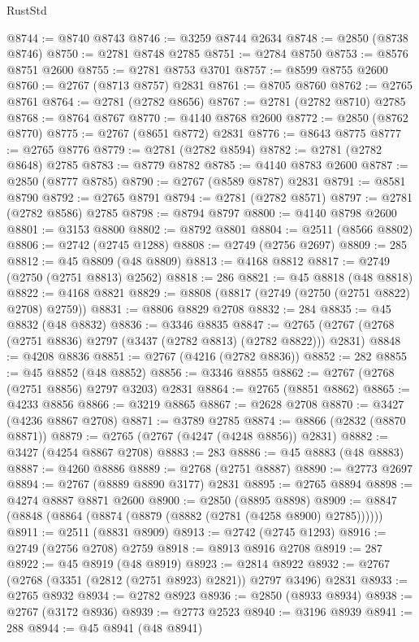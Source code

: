 \begin{lexlean}{RustStd}
\begin{coremodule}
@8744 := @8740 @8743
@8746 := @3259 @8744 @2634
@8748 := @2850 (@8738 @8746)
@8750 := @2781 @8748 @2785
@8751 := @2784 @8750
@8753 := @8576 @8751 @2600
@8755 := @2781 @8753 @3701
@8757 := @8599 @8755 @2600
@8760 := @2767 (@8713 @8757) @2831
@8761 := @8705 @8760
@8762 := @2765 @8761
@8764 := @2781 (@2782 @8656)
@8767 := @2781 (@2782 @8710) @2785
@8768 := @8764 @8767
@8770 := @4140 @8768 @2600
@8772 := @2850 (@8762 @8770)
@8775 := @2767 (@8651 @8772) @2831
@8776 := @8643 @8775
@8777 := @2765 @8776
@8779 := @2781 (@2782 @8594)
@8782 := @2781 (@2782 @8648) @2785
@8783 := @8779 @8782
@8785 := @4140 @8783 @2600
@8787 := @2850 (@8777 @8785)
@8790 := @2767 (@8589 @8787) @2831
@8791 := @8581 @8790
@8792 := @2765 @8791
@8794 := @2781 (@2782 @8571)
@8797 := @2781 (@2782 @8586) @2785
@8798 := @8794 @8797
@8800 := @4140 @8798 @2600
@8801 := @3153 @8800
@8802 := @8792 @8801
@8804 := @2511 (@8566 @8802)
@8806 := @2742 (@2745 @1288)
@8808 := @2749 (@2756 @2697)
@8809 := 285
@8812 := @45 @8809 (@48 @8809)
@8813 := @4168 @8812
@8817 := @2749 (@2750 (@2751 @8813) @2562)
@8818 := 286
@8821 := @45 @8818 (@48 @8818)
@8822 := @4168 @8821
@8829 := @8808 (@8817 (@2749 (@2750 (@2751 @8822) @2708) @2759))
@8831 := @8806 @8829 @2708
@8832 := 284
@8835 := @45 @8832 (@48 @8832)
@8836 := @3346 @8835
@8847 := @2765 (@2767 (@2768 (@2751 @8836) @2797 (@3437 (@2782 @8813) (@2782 @8822))) @2831)
@8848 := @4208 @8836
@8851 := @2767 (@4216 (@2782 @8836))
@8852 := 282
@8855 := @45 @8852 (@48 @8852)
@8856 := @3346 @8855
@8862 := @2767 (@2768 (@2751 @8856) @2797 @3203) @2831
@8864 := @2765 (@8851 @8862)
@8865 := @4233 @8856
@8866 := @3219 @8865
@8867 := @2628 @2708
@8870 := @3427 (@4236 @8867 @2708)
@8871 := @3789 @2785
@8874 := @8866 (@2832 (@8870 @8871))
@8879 := @2765 (@2767 (@4247 (@4248 @8856)) @2831)
@8882 := @3427 (@4254 @8867 @2708)
@8883 := 283
@8886 := @45 @8883 (@48 @8883)
@8887 := @4260 @8886
@8889 := @2768 (@2751 @8887)
@8890 := @2773 @2697
@8894 := @2767 (@8889 @8890 @3177) @2831
@8895 := @2765 @8894
@8898 := @4274 @8887 @8871 @2600
@8900 := @2850 (@8895 @8898)
@8909 := @8847 (@8848 (@8864 (@8874 (@8879 (@8882 (@2781 (@4258 @8900) @2785))))))
@8911 := @2511 (@8831 @8909)
@8913 := @2742 (@2745 @1293)
@8916 := @2749 (@2756 @2708) @2759
@8918 := @8913 @8916 @2708
@8919 := 287
@8922 := @45 @8919 (@48 @8919)
@8923 := @2814 @8922
@8932 := @2767 (@2768 (@3351 (@2812 (@2751 @8923) @2821)) @2797 @3496) @2831
@8933 := @2765 @8932
@8934 := @2782 @8923
@8936 := @2850 (@8933 @8934)
@8938 := @2767 (@3172 @8936)
@8939 := @2773 @2523
@8940 := @3196 @8939
@8941 := 288
@8944 := @45 @8941 (@48 @8941)

\end{coremodule}
\end{lexlean}
